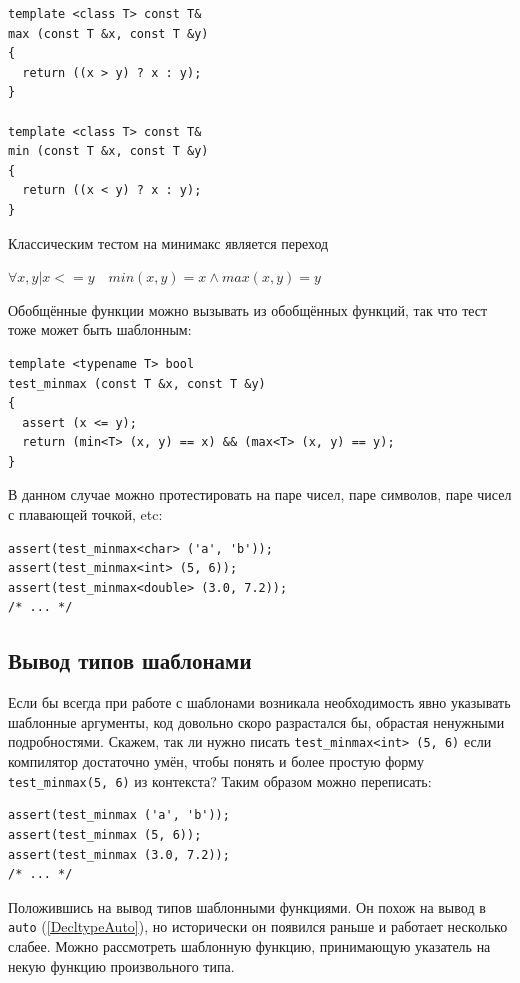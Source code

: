 \documentclass[a4paper,12pt,oneside]{book}
\begin{document}
\begin{lstlisting}
template <class T> const T&
max (const T &x, const T &y) 
{
  return ((x > y) ? x : y);
}

template <class T> const T&
min (const T &x, const T &y)
{
  return ((x < y) ? x : y);
}
\end{lstlisting}

Классическим тестом на минимакс является переход 

$\forall x, y | x <= y \quad min(x,y) = x \wedge max(x, y) = y$

Обобщённые функции можно вызывать из обобщённых функций, так что тест тоже может быть шаблонным:

\begin{lstlisting}
template <typename T> bool
test_minmax (const T &x, const T &y)
{
  assert (x <= y);
  return (min<T> (x, y) == x) && (max<T> (x, y) == y);
}

\end{lstlisting}

В данном случае можно протестировать на паре чисел, паре символов, паре чисел с плавающей точкой, etc:

\begin{lstlisting}
assert(test_minmax<char> ('a', 'b'));
assert(test_minmax<int> (5, 6));
assert(test_minmax<double> (3.0, 7.2));
/* ... */
\end{lstlisting}

\subsection{Вывод типов шаблонами}\label{TemplateInference}

Если бы всегда при работе с шаблонами возникала необходимость явно указывать шаблонные аргументы, код довольно скоро разрастался бы, обрастая ненужными подробностями. Скажем, так ли нужно писать \lstinline!test_minmax<int> (5, 6)! если компилятор достаточно умён, чтобы понять и более простую форму \lstinline!test_minmax(5, 6)! из контекста? Таким образом можно переписать:

\begin{lstlisting}
assert(test_minmax ('a', 'b'));
assert(test_minmax (5, 6));
assert(test_minmax (3.0, 7.2));
/* ... */
\end{lstlisting}

Положившись на вывод типов шаблонными функциями. Он похож на вывод в \lstinline!auto! (\ref{DecltypeAuto}), но исторически он появился раньше и работает несколько слабее. Можно рассмотреть шаблонную функцию, принимающую указатель на некую функцию произвольного типа.
\end{document}
